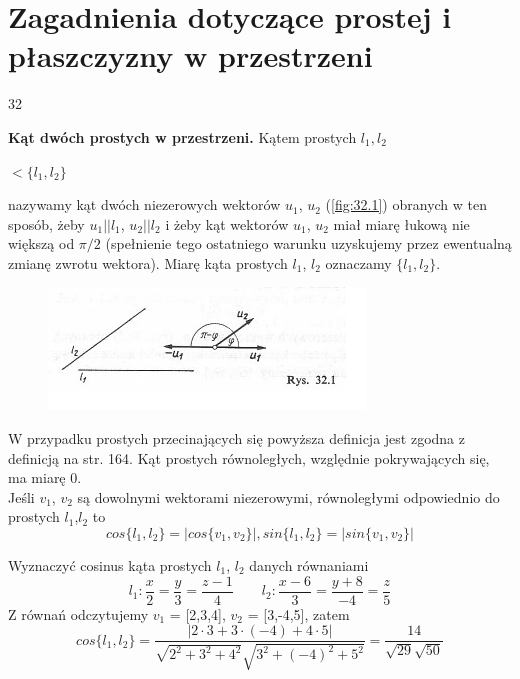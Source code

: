 \section{Zagadnienia dotyczące prostej i płaszczyzny w przestrzeni}{32}

\textbf{Kąt dwóch prostych w przestrzeni.} Kątem prostych $l_1, l_2$
\begin{center}
$< \{l_1, l_2\}$
\end{center}
nazywamy kąt dwóch niezerowych wektorów $u_1$, $u_2$ (\ref{fig:32.1}) obranych w ten sposób, żeby $u_1||l_1$, $u_2||l_2$ i żeby kąt wektorów $u_1$, $u_2$ miał miarę łukową nie większą od $\pi/2$ (spełnienie tego ostatniego warunku uzyskujemy przez ewentualną zmianę zwrotu wektora). Miarę kąta prostych $l_1$, $l_2$ oznaczamy $\{l_1, l_2\}$.

\begin{figure}[ht]
	\centering
		\includegraphics{rys/32_1.png}
	\caption{ }
	\label{fig:31.3}
\end{figure}

W przypadku prostych przecinających się powyższa definicja jest zgodna z definicją na str. 164. Kąt prostych równoległych, względnie pokrywających się, ma miarę $0$. \\
Jeśli $v_1$, $v_2$ są dowolnymi wektorami niezerowymi, równoległymi odpowiednio do prostych $l_1$,$l_2$ to
\begin{equation}
	cos \{l_1,l_2\} = |cos\{v_1, v_2\}|, sin \{l_1,l_2\} = |sin\{v_1, v_2\}| \nonumber
\end{equation}

\begin{przyklad}{32.1}
Wyznaczyć cosinus kąta prostych $l_1$, $l_2$ danych równaniami
\begin{equation}
	l_1: \frac{x}{2} = \frac{y}{3} = \frac{z - 1}{4} \qquad l_2: \frac{x - 6}{3} = \frac{y +8}{-4} = \frac{z}{5} \nonumber
\end{equation}
Z równań odczytujemy $v_1$ = [2,3,4], $v_2$ = [3,-4,5], zatem 
\begin{equation}
cos \{l_1,l_2\} = \frac{|2\cdot3+3\cdot(-4)+4\cdot5|}{\sqrt{2^2+3^2+4^2} \sqrt{3^2+(-4)^2+5^2}} = \frac{14}{\sqrt{29}\sqrt{50}} \nonumber
\end{equation}
\end{przyklad}

